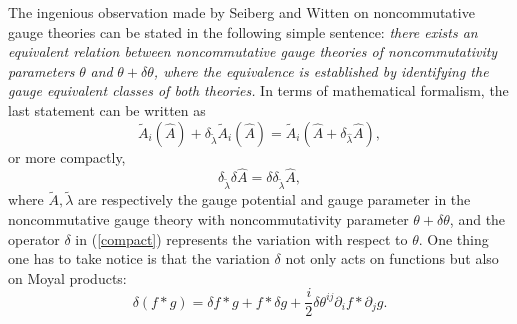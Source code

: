 \documentclass[a4paper,a4paper]{article}%
\begin{document}
The ingenious observation made by Seiberg and Witten on noncommutative gauge
theories can be stated in the following simple sentence: \emph{there exists an
equivalent relation between noncommutative gauge theories of noncommutativity
parameters }$\theta$ \emph{and }$\theta+\delta\theta$\emph{, where the
equivalence is established by identifying the gauge equivalent classes of both
theories. }In terms of mathematical formalism, the last statement can be
written as%
\begin{equation}
\tilde{A}_{i}(\hat{A})+\delta_{\tilde{\lambda}}\tilde{A}_{i}%
(\hat{A})=\tilde{A}_{i}(\hat{A}+\delta_{\hat{\lambda}}\hat{A}), \label{SW}%
\end{equation}
or more compactly,%
\begin{equation}
\delta_{\tilde{\lambda}}\delta\hat{A}=\delta\delta_{\tilde{\lambda}}\hat{A},
\label{compact}%
\end{equation}
where $\tilde{A},\tilde{\lambda}$ are respectively the gauge potential and
gauge parameter in the noncommutative gauge theory with noncommutativity
parameter $\theta+\delta\theta$, and the operator $\delta$ in (\ref{compact})
represents the variation with respect to $\theta$. One thing one has to take
notice is that the variation $\delta$ not only acts on functions but also on
Moyal products:%
\begin{equation}
\delta(f\ast g)=\delta f\ast g+f\ast\delta g+\frac{i}{2}\delta\theta
^{ij}\partial_{i}f\ast\partial_{j}g. \label{var}%
\end{equation}
\end{document}
